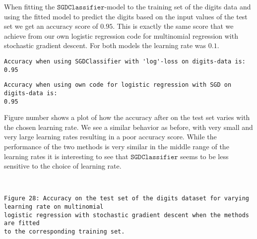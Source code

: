 \documentclass[11pt]{article}
\begin{document}
When fitting the \(\texttt{SGDClassifier}\)-model to the training set of
the digits data and using the fitted model to predict the digits based
on the input values of the test set we get an accuracy score of
\(0.95\). This is exactly the same score that we achieve from our own
logistic regression code for multinomial regression with stochastic
gradient descent. For both models the learning rate was \(0.1\).

    \begin{Verbatim}[commandchars=\\\{\}]
Accuracy when using SGDClassifier with 'log'-loss on digits-data is: 0.95
    \end{Verbatim}

    \begin{Verbatim}[commandchars=\\\{\}]
Accuracy when using own code for logistic regression with SGD on digits-data is:
0.95
    \end{Verbatim}

    Figure number shows a plot of how the accuracy after on the test set
varies with the chosen learning rate. We see a similar behavior as
before, with very small and very large learning rates resulting in a
poor accuracy score. While the performance of the two methods is very
similar in the middle range of the learning rates it is interesting to
see that \(\texttt{SGDClassifier}\) seems to be less sensitive to the
choice of learning rate.


    \begin{center}
    \end{center}
    { \hspace*{\fill} \\}
 

    \begin{Verbatim}[commandchars=\\\{\}]
Figure 28: Accuracy on the test set of the digits dataset for varying
learning rate on multinomial
logistic regression with stochastic gradient descent when the methods are fitted
to the corresponding training set.
    \end{Verbatim}



    \begin{center}
    \end{center}
    { \hspace*{\fill} \\}
    
\end{document}
